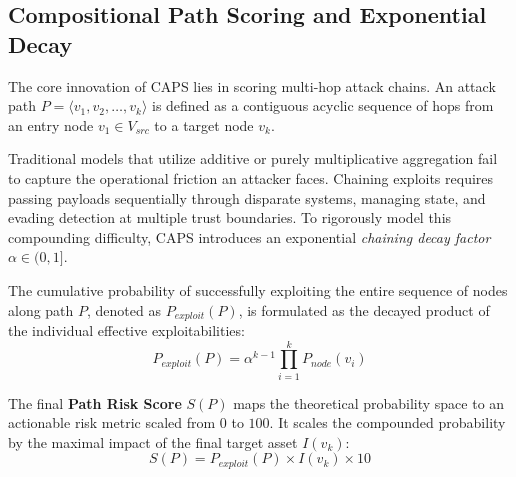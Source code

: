 \subsection{Compositional Path Scoring and Exponential Decay}
The core innovation of CAPS lies in scoring multi-hop attack chains. An attack path $P = \langle v_1, v_2, \dots, v_k \rangle$ is defined as a contiguous acyclic sequence of hops from an entry node $v_1 \in V_{src}$ to a target node $v_k$. 

Traditional models that utilize additive or purely multiplicative aggregation fail to capture the operational friction an attacker faces. Chaining exploits requires passing payloads sequentially through disparate systems, managing state, and evading detection at multiple trust boundaries. To rigorously model this compounding difficulty, CAPS introduces an exponential \textit{chaining decay factor} $\alpha \in (0, 1]$. 

The cumulative probability of successfully exploiting the entire sequence of nodes along path $P$, denoted as $P_{exploit}(P)$, is formulated as the decayed product of the individual effective exploitabilities:
\begin{equation}
P_{exploit}(P) = \alpha^{k-1} \prod_{i=1}^k P_{node}(v_i)
\end{equation}
 

The final \textbf{Path Risk Score} $S(P)$ maps the theoretical probability space to an actionable risk metric scaled from $0$ to $100$. It scales the compounded probability by the maximal impact of the final target asset $I(v_k)$:
\begin{equation}
S(P) = P_{exploit}(P) \times I(v_k) \times 10
\end{equation}

